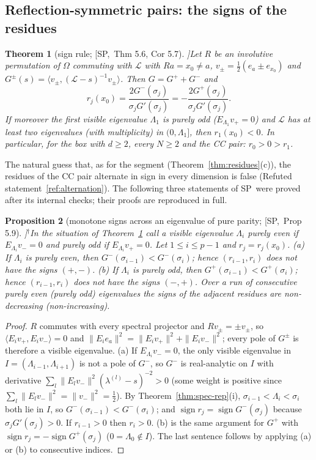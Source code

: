 \documentclass[10pt,a4paper]{article}
\theoremstyle{plain}
\newtheorem{theorem}{Theorem}[section]
\newtheorem{proposition}[theorem]{Proposition}
\theoremstyle{definition}
\newcommand{\NEW}{\ensuremath{^{\dagger}}}       %
\newcommand{\src}[2]{[\textsf{#1},~#2]}           %
\newcommand{\SPE}{\textsf{SP}}
\newcommand{\Lg}{\mathcal{L}}
\newcommand{\sgn}{\operatorname{sign}}
\begin{document}
\subsection{Reflection-symmetric pairs: the signs of the residues}

\begin{theorem}[sign rule; \src{\SPE}{Thm 5.6, Cor 5.7}]\label{thm:signrule}
Let $R$ be an involutive permutation of $\Omega$ commuting with $\Lg$ with $Ra=x_0\ne a$, $v_\pm=\frac12(e_a\pm e_{x_0})$ and $G^\pm(s)=\langle v_\pm,(\Lg-s)^{-1}v_\pm\rangle$. Then $G=G^++G^-$ and
\[
r_j(x_0)=\frac{2G^-(\sigma_j)}{\sigma_jG'(\sigma_j)}=-\frac{2G^+(\sigma_j)}{\sigma_jG'(\sigma_j)} .
\]
If moreover the first visible eigenvalue $\Lambda_1$ is purely odd ($E_{\Lambda_1}v_+=0$) and $\Lg$ has at least two eigenvalues (with multiplicity) in $(0,\Lambda_1]$, then $r_1(x_0)<0$. In particular, for the box with $d\ge2$, every $N\ge2$ and the CC pair: $r_0>0>r_1$.
\end{theorem}

The natural guess that, as for the segment (Theorem~\ref{thm:residues}(c)), the residues of the CC pair alternate in sign in every dimension is false (Refuted statement~\ref{ref:alternation}). The following three statements of \SPE\ were proved after its internal checks; their proofs are reproduced in full.

\begin{proposition}[monotone signs across an eigenvalue of pure parity; \src{\SPE}{Prop 5.9}]\NEW\label{prop:pureparity}
In the situation of Theorem~\ref{thm:signrule} call a visible eigenvalue $\Lambda_i$ purely even if $E_{\Lambda_i}v_-=0$ and purely odd if $E_{\Lambda_i}v_+=0$. Let $1\le i\le p-1$ and $r_j=r_j(x_0)$. (a) If $\Lambda_i$ is purely even, then $G^-(\sigma_{i-1})<G^-(\sigma_i)$; hence $(r_{i-1},r_i)$ does not have the signs $(+,-)$. (b) If $\Lambda_i$ is purely odd, then $G^+(\sigma_{i-1})<G^+(\sigma_i)$; hence $(r_{i-1},r_i)$ does not have the signs $(-,+)$. Over a run of consecutive purely even (purely odd) eigenvalues the signs of the adjacent residues are non-decreasing (non-increasing).
\end{proposition}
\begin{proof}
$R$ commutes with every spectral projector and $Rv_\pm=\pm v_\pm$, so $\langle E_iv_+,E_iv_-\rangle=0$ and $\|E_ie_a\|^2=\|E_iv_+\|^2+\|E_iv_-\|^2$; every pole of $G^\pm$ is therefore a visible eigenvalue. (a) If $E_{\Lambda_i}v_-=0$, the only visible eigenvalue in $I=(\Lambda_{i-1},\Lambda_{i+1})$ is not a pole of $G^-$, so $G^-$ is real-analytic on $I$ with derivative $\sum_l\|E_lv_-\|^2(\lambda^{(l)}-s)^{-2}>0$ (some weight is positive since $\sum_l\|E_lv_-\|^2=\|v_-\|^2=\frac12$). By Theorem~\ref{thm:spec-rep}(i), $\sigma_{i-1}<\Lambda_i<\sigma_i$ both lie in $I$, so $G^-(\sigma_{i-1})<G^-(\sigma_i)$; and $\sgn r_j=\sgn G^-(\sigma_j)$ because $\sigma_jG'(\sigma_j)>0$. If $r_{i-1}>0$ then $r_i>0$. (b) is the same argument for $G^+$ with $\sgn r_j=-\sgn G^+(\sigma_j)$ ($0=\Lambda_0\notin I$). The last sentence follows by applying (a) or (b) to consecutive indices.
\end{proof}
\end{document}
